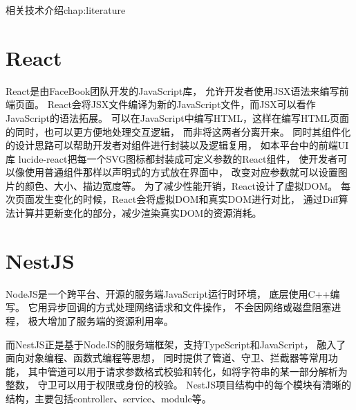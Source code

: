 \begin{cuzchapter}{相关技术介绍}{chap:literature}

	
	\section{React}\label{sec:React}
	React是由FaceBook团队开发的JavaScript库，
	允许开发者使用JSX语法来编写前端页面。
	React会将JSX文件编译为新的JavaScript文件，而JSX可以看作JavaScript的语法拓展\cite{1023559989.nh}。
	可以在JavaScript中编写HTML，这样在编写HTML页面的同时，也可以更方便地处理交互逻辑，
	而非将这两者分离开来。
	同时其组件化的设计思路可以帮助开发者对组件进行封装以及逻辑复用，
	如本平台中的前端UI库 
	lucide-react把每一个SVG图标都封装成可定义参数的React组件，
    使开发者可以像使用普通组件那样以声明式的方式放在界面中，
    改变对应参数就可以设置图片的颜色、大小、描边宽度等。
	为了减少性能开销，React设计了虚拟DOM。
	每次页面发生变化的时候，React会将虚拟DOM和真实DOM进行对比，
	通过Diff算法计算并更新变化的部分，减少渲染真实DOM的资源消耗\cite{1023036236.nh}。
	
	
	\section{NestJS}\label{sec:NestJS}
	NodeJS是一个跨平台、开源的服务端JavaScript运行时环境，
	底层使用C++编写。
	它用异步回调的方式处理网络请求和文件操作，
	不会因网络或磁盘阻塞进程，
	极大增加了服务端的资源利用率\cite{1021830702.nh}。
	
	而NestJS正是基于NodeJS的服务端框架，支持TypeScript和JavaScript，
	融入了面向对象编程、函数式编程等思想\cite{pham2020developing}，
	同时提供了管道、守卫、拦截器等常用功能，
	其中管道可以用于请求参数格式校验和转化，如将字符串的某一部分解析为整数，
	守卫可以用于权限或身份的校验。
	NestJS项目结构中的每个模块有清晰的结构，主要包括controller、service、module等。
	

\end{cuzchapter}
